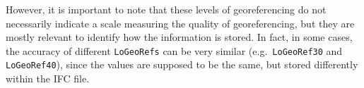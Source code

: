 However, it is important to note that these levels of georeferencing do not necessarily indicate a scale measuring the quality of georeferencing, but they are mostly relevant to identify how the information is stored.
In fact, in some cases, the accuracy of different \texttt{LoGeoRefs} can be very similar (e.g.\ \texttt{LoGeoRef30} and \texttt{LoGeoRef40}), since the values are supposed to be the same, but stored differently within the IFC file.


